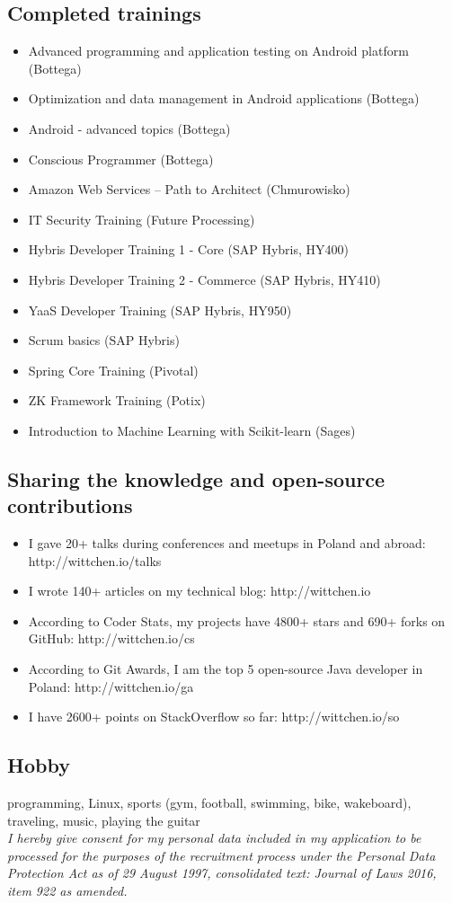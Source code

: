 \documentclass{article}
\begin{document}
    \subsection*{Completed trainings}
    \begin{itemize}
      \item Advanced programming and application testing on Android platform (Bottega)
      \item Optimization and data management in Android applications (Bottega)
      \item Android - advanced topics (Bottega)
      \item Conscious Programmer (Bottega)
      \item Amazon Web Services – Path to Architect (Chmurowisko)
      \item IT Security Training (Future Processing)
      \item Hybris Developer Training 1 - Core (SAP Hybris, HY400)
      \item Hybris Developer Training 2 - Commerce (SAP Hybris, HY410)
      \item YaaS Developer Training (SAP Hybris, HY950)
      \item Scrum basics (SAP Hybris)
      \item Spring Core Training (Pivotal)
      \item ZK Framework Training (Potix)
      \item Introduction to Machine Learning with Scikit-learn (Sages)
    \end{itemize}

    \subsection*{Sharing the knowledge and open-source contributions}
    \begin{itemize}
      \item I gave 20+ talks during conferences and meetups in Poland and abroad: http://wittchen.io/talks
      \item I wrote 140+ articles on my technical blog: http://wittchen.io
      \item According to Coder Stats, my projects have 4800+ stars and 690+ forks on GitHub: http://wittchen.io/cs
      \item According to Git Awards, I am the top 5 open-source Java developer in Poland: http://wittchen.io/ga
      \item I have 2600+ points on StackOverflow so far: http://wittchen.io/so
    \end{itemize}

    \subsection*{Hobby}
    programming, Linux, sports (gym, football, swimming, bike, wakeboard), traveling, music, playing the guitar\\

    \textit{
    I hereby give consent for my personal data included in my application
    to be processed for the purposes of the recruitment process
    under the Personal Data Protection Act as of 29 August 1997,
    consolidated text: Journal of Laws 2016, item 922 as amended.
    }
\end{document}

